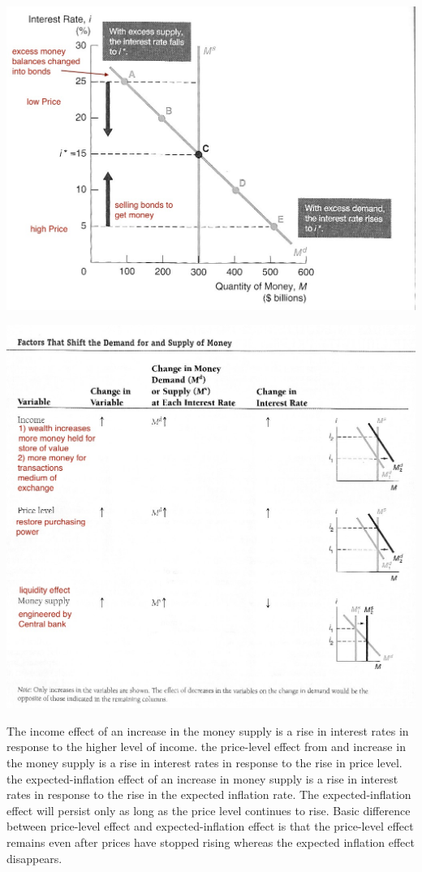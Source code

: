 \documentclass[12pt]{examnotes}
\begin{document}
\includegraphics[scale=0.3]{./imgs/56.jpg}

\includegraphics[scale=0.35]{./imgs/57.jpg}

 The income effect of an increase in the money supply is a rise in interest rates in response to the higher level of income.
 the price-level effect from and increase in the money supply is a rise in interest rates in response to the rise in price level.
 the expected-inflation effect of an increase in money supply is a rise in interest rates in response to the rise in the expected inflation rate. The expected-inflation effect will persist only as long as the price level continues to rise.
\ra Basic difference between price-level effect and expected-inflation effect is that the price-level effect remains even after prices have stopped rising whereas the expected inflation effect disappears.
\end{document}
